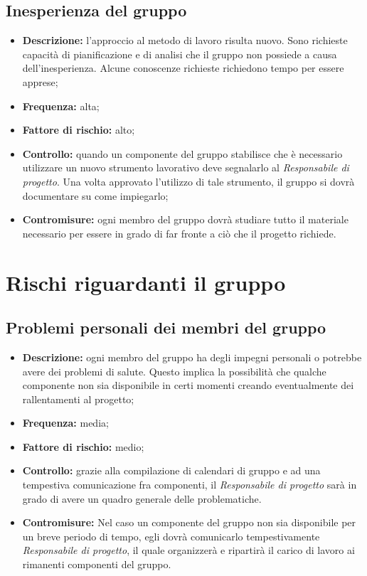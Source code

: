 \documentclass[./PianodiProgetto.tex]{subfiles}
\begin{document}
	\subsection{Inesperienza del gruppo}
	\begin{itemize}
		\item \textbf{Descrizione:} l'approccio al metodo di lavoro risulta nuovo. Sono richieste capacità di pianificazione e di analisi che il gruppo non possiede a causa dell'inesperienza. Alcune conoscenze richieste richiedono tempo per essere apprese;
		\item \textbf{Frequenza:} alta;
		\item \textbf{Fattore di rischio:} alto;
		\item \textbf{Controllo:} quando un componente del gruppo stabilisce che è necessario utilizzare un nuovo strumento lavorativo deve segnalarlo al  \textit{Responsabile di progetto}. Una volta approvato l'utilizzo di tale strumento, il gruppo si dovrà documentare su come impiegarlo;
		\item \textbf{Contromisure:} ogni membro del gruppo dovrà studiare tutto il materiale necessario per essere in grado di far fronte  a ciò che il progetto richiede.
	\end{itemize}
	
	\section{Rischi riguardanti il gruppo}
	\subsection{Problemi personali dei membri del gruppo}
	\begin{itemize}
		\item \textbf{Descrizione:} ogni membro del gruppo ha degli impegni personali o potrebbe avere dei problemi di salute. Questo implica la possibilità che qualche componente non sia disponibile in certi momenti creando eventualmente dei rallentamenti al progetto;
		\item \textbf{Frequenza:} media;
		\item \textbf{Fattore di rischio:} medio;
		\item \textbf{Controllo:} grazie alla compilazione di calendari di gruppo e ad una tempestiva comunicazione fra componenti, il \textit{Responsabile di progetto} sarà in grado di avere un quadro generale delle problematiche.
		\item \textbf{Contromisure:} Nel caso un componente del gruppo non sia disponibile per un breve periodo di tempo, egli dovrà comunicarlo tempestivamente \textit{Responsabile di progetto}, il quale organizzerà e ripartirà il carico di lavoro ai rimanenti componenti del gruppo. 
	\end{itemize}
	
\end{document}
